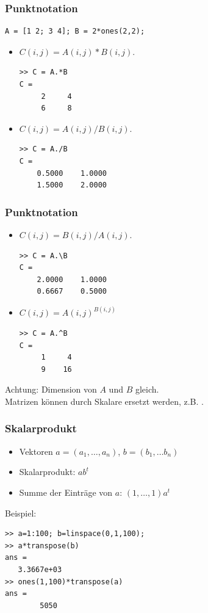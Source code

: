 \documentclass[hyperref={xetex}]{beamer}
\begin{document}
%
%
\begin{frame}[fragile]\frametitle{Punktnotation}
\begin{lstlisting}
A = [1 2; 3 4]; B = 2*ones(2,2);
\end{lstlisting}
\begin{itemize}
\item $C(i,j)=A(i,j)*B(i,j)$.
\begin{lstlisting}
>> C = A.*B
C =
     2     4
     6     8
\end{lstlisting}
\item $C(i,j)=A(i,j)/B(i,j)$.
\begin{lstlisting}
>> C = A./B
C =
    0.5000    1.0000
    1.5000    2.0000
\end{lstlisting}
\end{itemize}
\end{frame}
%
%
\begin{frame}[fragile]\frametitle{Punktnotation}
\begin{itemize}
\item $C(i,j)=B(i,j)/A(i,j)$.
\begin{lstlisting}
>> C = A.\B
C =
    2.0000    1.0000
    0.6667    0.5000
\end{lstlisting}
\item $C(i,j)=A(i,j)^{B(i,j)}$
\begin{lstlisting}
>> C = A.^B
C =
     1     4
     9    16
\end{lstlisting}
\end{itemize}
\alert{Achtung:} Dimension von $A$ und $B$ gleich. \\Matrizen können durch
Skalare ersetzt werden, z.B. .
\end{frame}
%
%
\begin{frame}[fragile]\frametitle{Skalarprodukt}
\begin{itemize}
 \item Vektoren $a=(a_1, \dots ,a_n)$, $b=(b_1, \dots b_n)$ \\
\item Skalarprodukt: $a b^t$\\
\item Summe der Einträge von $a$: $(1, \dots , 1) a^t$\\
\end{itemize}
Beispiel:
\begin{lstlisting}
>> a=1:100; b=linspace(0,1,100);
>> a*transpose(b)
ans =
   3.3667e+03
>> ones(1,100)*transpose(a)
ans =
        5050
\end{lstlisting}  

\end{frame}
\end{document}
